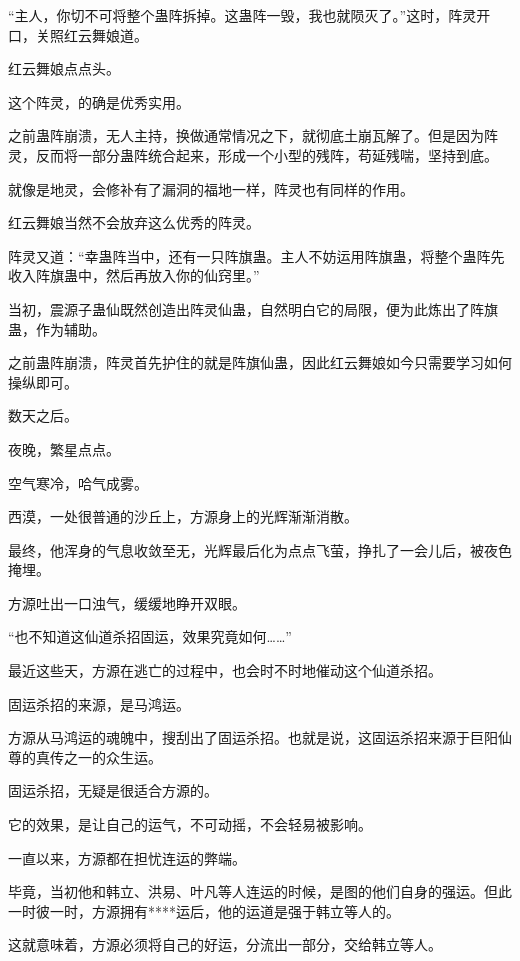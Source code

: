 
\begin{this_body}

“主人，你切不可将整个蛊阵拆掉。这蛊阵一毁，我也就陨灭了。”这时，阵灵开口，关照红云舞娘道。

红云舞娘点点头。

这个阵灵，的确是优秀实用。

之前蛊阵崩溃，无人主持，换做通常情况之下，就彻底土崩瓦解了。但是因为阵灵，反而将一部分蛊阵统合起来，形成一个小型的残阵，苟延残喘，坚持到底。

就像是地灵，会修补有了漏洞的福地一样，阵灵也有同样的作用。

红云舞娘当然不会放弃这么优秀的阵灵。

阵灵又道：“幸蛊阵当中，还有一只阵旗蛊。主人不妨运用阵旗蛊，将整个蛊阵先收入阵旗蛊中，然后再放入你的仙窍里。”

当初，震源子蛊仙既然创造出阵灵仙蛊，自然明白它的局限，便为此炼出了阵旗蛊，作为辅助。

之前蛊阵崩溃，阵灵首先护住的就是阵旗仙蛊，因此红云舞娘如今只需要学习如何操纵即可。

数天之后。

夜晚，繁星点点。

空气寒冷，哈气成雾。

西漠，一处很普通的沙丘上，方源身上的光辉渐渐消散。

最终，他浑身的气息收敛至无，光辉最后化为点点飞萤，挣扎了一会儿后，被夜色掩埋。

方源吐出一口浊气，缓缓地睁开双眼。

“也不知道这仙道杀招固运，效果究竟如何……”

最近这些天，方源在逃亡的过程中，也会时不时地催动这个仙道杀招。

固运杀招的来源，是马鸿运。

方源从马鸿运的魂魄中，搜刮出了固运杀招。也就是说，这固运杀招来源于巨阳仙尊的真传之一的众生运。

固运杀招，无疑是很适合方源的。

它的效果，是让自己的运气，不可动摇，不会轻易被影响。

一直以来，方源都在担忧连运的弊端。

毕竟，当初他和韩立、洪易、叶凡等人连运的时候，是图的他们自身的强运。但此一时彼一时，方源拥有****运后，他的运道是强于韩立等人的。

这就意味着，方源必须将自己的好运，分流出一部分，交给韩立等人。


\end{this_body}
